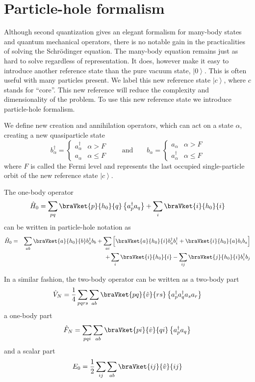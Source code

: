 \section{Particle-hole formalism}
	Although second quantization gives an elegant formalism for many-body states and quantum mechanical operators, there is no notable gain in the practicalities of solving the Schrödinger equation. The many-body equation remains just as hard to solve regardless of representation. It does, however make it easy to introduce another reference state than the pure vacuum state, $\left | 0 \right \rangle$. This is often useful with many particles present. We label this new reference state $\left | c \right \rangle$, where $c$ stands for ``core''. This new reference will reduce the complexity and dimensionality of the problem. To use this new reference state we introduce particle-hole formalism.

	We define new creation and annihilation operators, which can act on a state $\alpha$, creating a new quasiparticle state
	\[
		b_{\alpha}^{\dagger}=\begin{cases}
		a_{\alpha}^{\dagger} & \alpha>F\\
		a_{\alpha} & \alpha\leq F
		\end{cases}\qquad\mbox{and}\qquad b_{\alpha}=\begin{cases}
		a_{\alpha} & \alpha>F\\
		a_{\alpha}^{\dagger} & \alpha\leq F
		\end{cases}
	\]
	where $F$ is called the Fermi level and represents the last occupied single-particle orbit of the new reference state $\left | c \right \rangle$.

	The one-body operator 
	\[
		\hat{H}_{0} = \sum_{pq} \braVket{p}{h_{0}}{q}\left\{a_{p}^{\dagger}a_{q}\right\}+\sum_{i}\braVket{i}{h_{0}}{i}
	\]
	can be written in particle-hole notation as 
	\begin{eqnarray*}
		\hat{H}_{0} & = & \sum_{ab}\braVket{a}{h_{0}}{b}b_{a}^{\dagger}b_{b}+\sum_{ai}\left[\braVket{a}{h_{0}}{i}b_{a}^{\dagger}b_{i}^{\dagger}+\braVket{i}{h_{0}}{a}b_{i}b_{a}\right]\\
		 &  & +\sum_{i}\braVket{i}{h_{0}}{i}-\sum_{ij}\braVket{j}{h_{0}}{i}b_{i}^{\dagger}b_{j}
	\end{eqnarray*}

	In a similar fashion, the two-body operator can be written as a two-body part
	\[
		\hat{V}_{N}=\frac{1}{4}\sum_{pqrs}\sum_{ab}\braVket{pq}{\hat{v}}{rs}\left\{ a_{p}^{\dagger}a_{q}^{\dagger}a_{s}a_{r}\right\} 
	\]
	a one-body part
	\[
		\hat{F}_{N}=\sum_{pqi}\sum_{ab}\braVket{pi}{\hat{v}}{qi}\left\{ a_{p}^{\dagger}a_{q}\right\} 
	\]
	and a scalar part
	\[
	E_{0}=\frac{1}{2}\sum_{ij}\sum_{ab}\braVket{ij}{\hat{v}}{ij}
	\]

